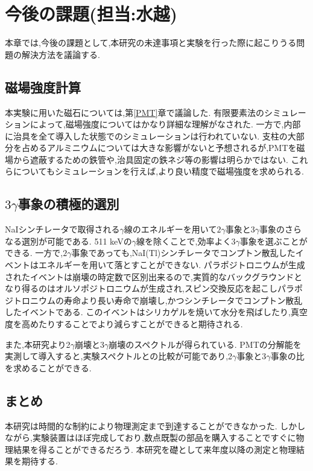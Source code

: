 \chapter{今後の課題(担当:水越)}\label{prospect}

本章では,今後の課題として,本研究の未達事項と実験を行った際に起こりうる問題の解決方法を議論する.

\section{磁場強度計算}
本実験に用いた磁石については,第\ref{PMT}章で議論した.
有限要素法のシミュレーションによって,磁場強度についてはかなり詳細な理解がなされた.
一方で,内部に治具を全て導入した状態でのシミュレーションは行われていない.
支柱の大部分を占めるアルミニウムについては大きな影響がないと予想されるが,PMTを磁場から遮蔽するための鉄管や,治具固定の鉄ネジ等の影響は明らかではない.
これらについてもシミュレーションを行えば,より良い精度で磁場強度を求められる.

\section{$3\gamma$事象の積極的選別}
NaIシンチレータで取得される$\gamma$線のエネルギーを用いて$2\gamma$事象と$3\gamma$事象のさらなる選別が可能である.
511 keVの$\gamma$線を除くことで,効率よく$3\gamma$事象を選ぶことができる.
一方で,$2\gamma$事象であっても,NaI(Tl)シンチレータでコンプトン散乱したイベントはエネルギーを用いて落とすことができない.
パラポジトロニウムが生成されたイベントは崩壊の時定数で区別出来るので,実質的なバックグラウンドとなり得るのはオルソポジトロニウムが生成され,スピン交換反応を起こしパラポジトロニウムの寿命より長い寿命で崩壊し,かつシンチレータでコンプトン散乱したイベントである.
このイベントはシリカゲルを焼いて水分を飛ばしたり,真空度を高めたりすることでより減らすことができると期待される.

また,本研究より2$\gamma$崩壊と3$\gamma$崩壊のスペクトルが得られている.
PMTの分解能を実測して導入すると,実験スペクトルとの比較が可能であり,2$\gamma$事象と3$\gamma$事象の比を求めることができる.

\section{まとめ}
本研究は時間的な制約により物理測定まで到達することができなかった.
しかしながら,実験装置はほぼ完成しており,数点既製の部品を購入することですぐに物理結果を得ることができるだろう.
本研究を礎として来年度以降の測定と物理結果を期待する.
